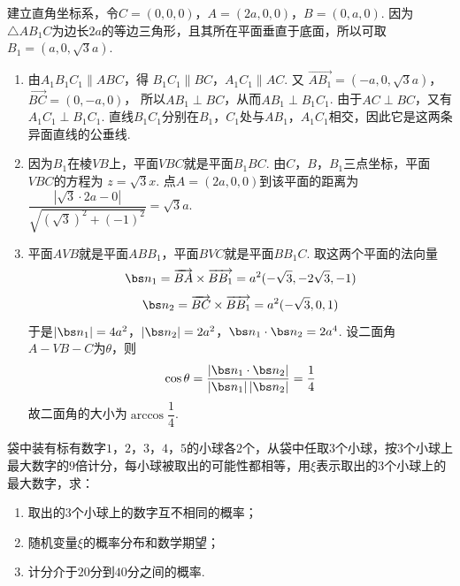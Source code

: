 \begin{solution}
建立直角坐标系，令\(C=(0,0,0)\)，\(A=(2a,0,0)\)，\(B=(0,a,0)\). 因为\(\triangle AB_1C\)为边长\(2a\)的等边三角形，且其所在平面垂直于底面，所以可取\(B_1=(a,0,\sqrt3a)\).

\begin{enumerate}
\item 由\(A_1B_1C_1\parallel ABC\)，得
\(B_1C_1\parallel BC\)，\(A_1C_1\parallel AC\).
又
\(\overrightarrow{AB_1}=(-a,0,\sqrt3a)\)，\(\overrightarrow{BC}=(0,-a,0)\)，
所以\(AB_1\perp BC\)，从而\(AB_1\perp B_1C_1\). 由于\(AC\perp BC\)，又有\(A_1C_1\perp B_1C_1\). 直线\(B_1C_1\)分别在\(B_1\)，\(C_1\)处与\(AB_1\)，\(A_1C_1\)相交，因此它是这两条异面直线的公垂线.

\item 因为\(B_1\)在棱\(VB\)上，平面\(VBC\)就是平面\(B_1BC\). 由\(C\)，\(B\)，\(B_1\)三点坐标，平面\(VBC\)的方程为
\(z=\sqrt3x\).
点\(A=(2a,0,0)\)到该平面的距离为
\(\dfrac{|\sqrt3\cdot2a-0|}{\sqrt{(\sqrt3)^2+(-1)^2}}=\sqrt3a\).

\item 平面\(AVB\)就是平面\(ABB_1\)，平面\(BVC\)就是平面\(BB_1C\). 取这两个平面的法向量
\[
\bs n_1=\overrightarrow{BA}\times\overrightarrow{BB_1}
=a^2(-\sqrt3,-2\sqrt3,-1)
\]
\[
\bs n_2=\overrightarrow{BC}\times\overrightarrow{BB_1}
=a^2(-\sqrt3,0,1)
\]
于是\(|\bs n_1|=4a^2\)，\(|\bs n_2|=2a^2\)，\(\bs n_1\cdot\bs n_2=2a^4\).
设二面角\(A-VB-C\)为\(\theta\)，则
\[
\cos\theta
=\frac{|\bs n_1\cdot\bs n_2|}{|\bs n_1|\,|\bs n_2|}
=\frac14
\]
故二面角的大小为\(\arccos\dfrac14\).
\end{enumerate}
\end{solution}

\begin{problem}
袋中装有标有数字\(1\)，\(2\)，\(3\)，\(4\)，\(5\)的小球各\(2\)个，从袋中任取\(3\)个小球，按\(3\)个小球上最大数字的\(9\)倍计分，每小球被取出的可能性都相等，用\(\xi\)表示取出的\(3\)个小球上的最大数字，求：

\begin{enumerate}
\item 取出的\(3\)个小球上的数字互不相同的概率；
\item 随机变量\(\xi\)的概率分布和数学期望；
\item 计分介于\(20\)分到\(40\)分之间的概率.
\end{enumerate}
\end{problem}

